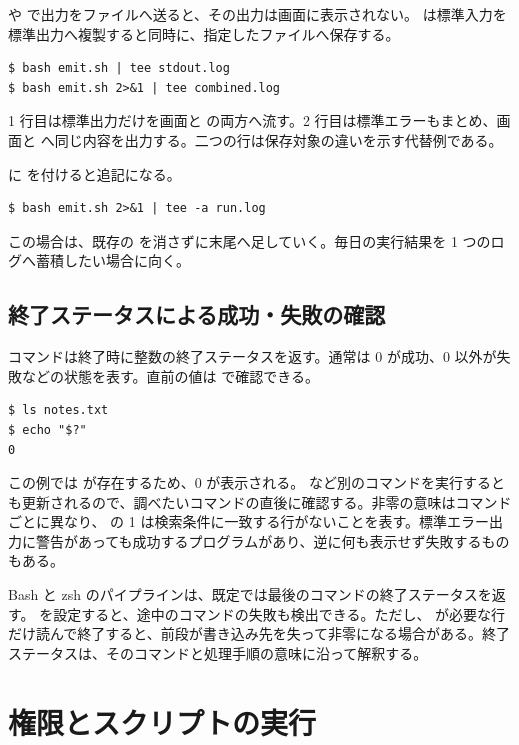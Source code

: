 \code{>} や \code{>>} で出力をファイルへ送ると、その出力は画面に表示されない。 は標準入力を標準出力へ複製すると同時に、指定したファイルへ保存する。

\begin{lstlisting}[numbers=none, xleftmargin=2\zw]
$ bash emit.sh | tee stdout.log
$ bash emit.sh 2>&1 | tee combined.log
\end{lstlisting}

1 行目は標準出力だけを画面と  の両方へ流す。2 行目は標準エラーもまとめ、画面と  へ同じ内容を出力する。二つの行は保存対象の違いを示す代替例である。

 に  を付けると追記になる。

\begin{lstlisting}[numbers=none, xleftmargin=2\zw]
$ bash emit.sh 2>&1 | tee -a run.log
\end{lstlisting}

この場合は、既存の  を消さずに末尾へ足していく。毎日の実行結果を 1 つのログへ蓄積したい場合に向く。

\subsection{終了ステータスによる成功・失敗の確認}
\label{sec:exit-status}

コマンドは終了時に整数の終了ステータスを返す。通常は 0 が成功、0 以外が失敗などの状態を表す。直前の値は  で確認できる。
\begin{lstlisting}[numbers=none, xleftmargin=2\zw]
$ ls notes.txt
$ echo "$?"
0
\end{lstlisting}
この例では  が存在するため、0 が表示される。 など別のコマンドを実行すると  も更新されるので、調べたいコマンドの直後に確認する。非零の意味はコマンドごとに異なり、 の 1 は検索条件に一致する行がないことを表す。標準エラー出力に警告があっても成功するプログラムがあり、逆に何も表示せず失敗するものもある。

Bash と zsh のパイプラインは、既定では最後のコマンドの終了ステータスを返す。 を設定すると、途中のコマンドの失敗も検出できる。ただし、 が必要な行だけ読んで終了すると、前段が書き込み先を失って非零になる場合がある。終了ステータスは、そのコマンドと処理手順の意味に沿って解釈する。

\section{権限とスクリプトの実行}

